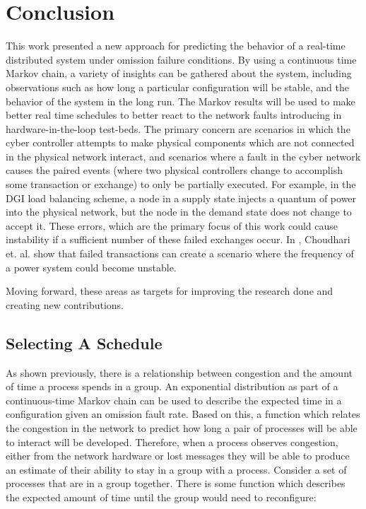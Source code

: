 \chapter{Conclusion}

This work presented a new approach for predicting the behavior of a real-time distributed system under omission failure conditions.
By using a continuous time Markov chain, a variety of insights can be gathered about the system, including observations such as how long a particular configuration will be stable, and the behavior of the system in the long run. 
The Markov results will be used  to make better real time schedules to better react to the network faults introducing in hardware-in-the-loop test-beds.
The primary concern are scenarios in which the cyber controller attempts to make physical components which are not connected in the physical network interact, and scenarios where a fault in the cyber network causes the paired events (where two physical controllers change to accomplish some transaction or exchange) to only be partially executed.
For example, in the DGI load balancing scheme, a node in a supply state injects a quantum of power into the physical network, but the node in the demand state does not change to accept it.
These errors, which are the primary focus of this work could cause instability if a sufficient number of these failed exchanges occur. In \cite{HARINI}, Choudhari et. al. show that failed transactions can create a scenario where the frequency of a power system could become unstable. 

Moving forward, these areas as targets for improving the research done and creating new contributions.

\section{Selecting A Schedule}

As shown previously, there is a relationship between congestion and the amount of time a process spends in a group.
An exponential distribution as part of a continuous-time Markov chain can be used to describe the expected time in a configuration given an omission fault rate.
Based on this, a function which relates the congestion in the network to predict how long a pair of processes will be able to interact will be developed.
Therefore, when a process observes congestion, either from the network hardware or lost messages they will be able to produce an estimate of their ability to stay in a group with a process.
Consider a set of processes that are in a group together.
There is some function which describes the expected amount of time until the group would need to reconfigure:

